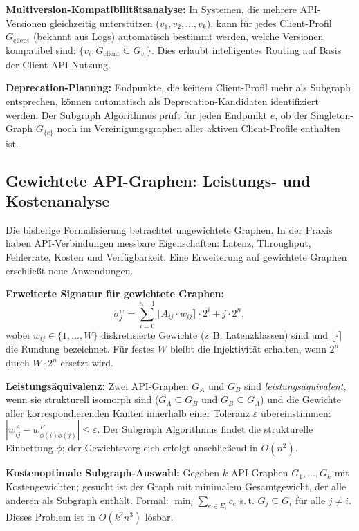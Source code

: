 ﻿\documentclass[a4paper,12pt]{article}
\theoremstyle{definition}
\begin{document}
\textbf{Multiversion-Kompatibilitätsanalyse:} In Systemen, die mehrere API-Versionen
gleichzeitig unterstützen ($v_1, v_2, \ldots, v_k$), kann für jedes Client-Profil
$G_{\mathrm{client}}$ (bekannt aus Logs) automatisch bestimmt werden, welche Versionen
kompatibel sind: $\{v_i : G_{\mathrm{client}} \subseteq G_{v_i}\}$. Dies erlaubt
intelligentes Routing auf Basis der Client-API-Nutzung.

\textbf{Deprecation-Planung:} Endpunkte, die keinem Client-Profil mehr als Subgraph
entsprechen, können automatisch als Deprecation-Kandidaten identifiziert werden.
Der Subgraph Algorithmus prüft für jeden Endpunkt $e$, ob der Singleton-Graph
$G_{\{e\}}$ noch im Vereinigungsgraphen aller aktiven Client-Profile enthalten ist.

\subsection{Gewichtete API-Graphen: Leistungs- und Kostenanalyse}

Die bisherige Formalisierung betrachtet ungewichtete Graphen. In der Praxis haben
API-Verbindungen messbare Eigenschaften: Latenz, Throughput, Fehlerrate, Kosten und
Verfügbarkeit. Eine Erweiterung auf gewichtete Graphen erschließt neue Anwendungen.

\textbf{Erweiterte Signatur für gewichtete Graphen:}
\[
  \sigma_j^w = \sum_{i=0}^{n-1} \lfloor A_{ij} \cdot w_{ij} \rceil \cdot 2^i + j \cdot 2^n,
\]
wobei $w_{ij} \in \{1, \ldots, W\}$ diskretisierte Gewichte (z.\,B. Latenzklassen)
sind und $\lfloor \cdot \rceil$ die Rundung bezeichnet. Für festes $W$ bleibt die
Injektivität erhalten, wenn $2^n$ durch $W \cdot 2^n$ ersetzt wird.

\textbf{Leistungsäquivalenz:} Zwei API-Graphen $G_A$ und $G_B$ sind
\emph{leistungsäquivalent}, wenn sie strukturell isomorph sind ($G_A \subseteq G_B$
und $G_B \subseteq G_A$) und die Gewichte aller korrespondierenden Kanten innerhalb
einer Toleranz $\varepsilon$ übereinstimmen: $|w_{ij}^A - w_{\phi(i)\phi(j)}^B| \leq \varepsilon$.
Der Subgraph Algorithmus findet die strukturelle Einbettung $\phi$; der Gewichtsvergleich
erfolgt anschließend in $O(n^2)$.

\textbf{Kostenoptimale Subgraph-Auswahl:} Gegeben $k$ API-Graphen
$G_1, \ldots, G_k$ mit Kostengewichten; gesucht ist der Graph mit minimalem
Gesamtgewicht, der alle anderen als Subgraph enthält. Formal:
$\min_{i} \sum_{e \in E_i} c_e$ s.\,t. $G_j \subseteq G_i$ für alle $j \neq i$.
Dieses Problem ist in $O(k^2 n^3)$ lösbar.
\end{document}
